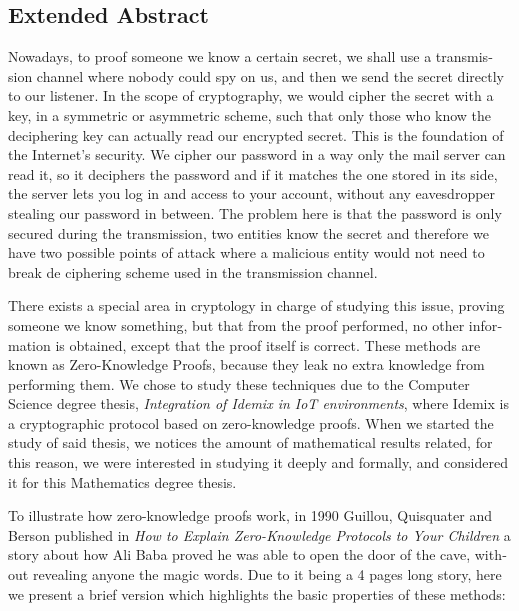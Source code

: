
\begingroup
\let\clearpage\relax
\let\cleardoublepage\relax
\let\cleardoublepage\relax

\begin{otherlanguage}{english}
\chapter*{Extended Abstract}

Nowadays, to proof someone we know a certain secret, we shall use a transmission channel where nobody could spy on us, and then we send the secret directly to our listener. In the scope of cryptography, we would cipher the secret with a key, in a symmetric or asymmetric scheme, such that only those who know the deciphering key can actually read our encrypted secret. This is the foundation of the Internet's security. We cipher our password in a way only the mail server can read it, so it deciphers the password and if it matches the one stored in its side, the server lets you log in and access to your account, without any eavesdropper stealing our password in between. The problem here is that the password is only secured during the transmission, two entities know the secret and therefore we have two possible points of attack where a malicious entity would not need to break de ciphering scheme used in the transmission channel.

There exists a special area in cryptology in charge of studying this issue, proving someone we know something, but that from the proof performed, no other information is obtained, except that the proof itself is correct. These methods are known as Zero-Knowledge Proofs, because they leak no extra knowledge from performing them.
We chose to study these techniques due to the Computer Science degree thesis, \textit{Integration of Idemix in IoT environments}, where Idemix is a cryptographic protocol based on zero-knowledge proofs. When we started the study of said thesis, we notices the amount of mathematical results related, for this reason, we were interested in studying it deeply and formally, and considered it for this Mathematics degree thesis.

To illustrate how zero-knowledge proofs work, in 1990 Guillou, Quisquater and Berson published in \textit{How to Explain Zero-Knowledge Protocols to Your Children} \citep{ZKPcave:story} a story about how Ali Baba proved he was able to open the door of the cave, without revealing anyone the magic words. Due to it being a 4 pages long story, here we present a brief version which highlights the basic properties of these methods:


\end{otherlanguage}
